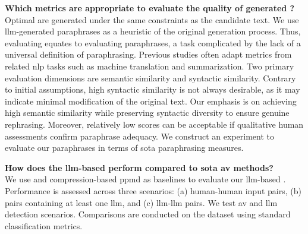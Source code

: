 \begin{questions}
    \item \textbf{Which metrics are appropriate to evaluate the quality of generated \imps{}?} \label{enum:rq2} \hfill \\
    Optimal \imps{} are generated under the same constraints as the candidate text.
    We use \ac{llm}-generated paraphrases as a heuristic of the original generation process.
    Thus, evaluating \imps{} equates to evaluating paraphrases, a task complicated by the lack of a universal definition of paraphrasing.
    Previous studies often adapt metrics from related \ac{nlp} tasks such as machine translation and summarization.
    Two primary evaluation dimensions are semantic similarity and syntactic similarity.
    Contrary to initial assumptions, high syntactic similarity is not always desirable, as it may indicate minimal modification of the original text.
    Our emphasis is on achieving high semantic similarity while preserving syntactic diversity to ensure genuine rephrasing.
    Moreover, relatively low scores can be acceptable if qualitative human assessments confirm paraphrase adequacy.
    We construct an experiment to evaluate our paraphrases in terms of \acl{sota} paraphrasing measures. 


    \item \textbf{How does the \ac{llm}-based \impAppr{} perform compared to \acl{sota} \ac{av} methods?} \label{enum:rq3} \hfill \\
    We use \unmasking{} and compression-based \ac{ppmd} as baselines to evaluate our \ac{llm}-based \impAppr{}.
    Performance is assessed across three scenarios: (a) human-human input pairs,
    (b) pairs containing at least one \ac{llm}, and (c) \ac{llm}-\ac{llm} pairs.
    We test \ac{av} and \ac{llm} detection scenarios.
    Comparisons are conducted on the \dataStudent{} dataset using standard classification metrics.
    
\end{questions}


